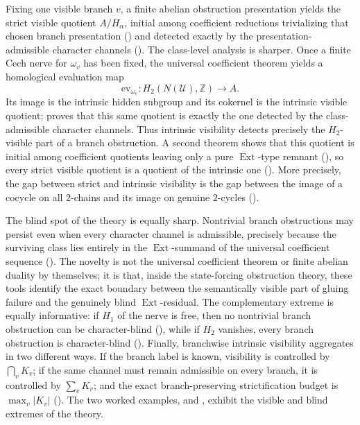 Fixing one visible branch $v$, a finite abelian obstruction presentation yields the strict visible quotient $A/H_\alpha$, initial among coefficient reductions trivializing that chosen branch presentation () and detected exactly by the presentation-admissible character channels (). The class-level analysis is sharper. Once a finite Cech nerve for $\omega_v$ has been fixed, the universal coefficient theorem yields a homological evaluation map
\[
\mathrm{ev}_{\omega_v}:H_2(N(\mathcal U),\mathbb Z)\to A.
\]
Its image is the intrinsic hidden subgroup and its cokernel is the intrinsic visible quotient;  proves that this same quotient is exactly the one detected by the class-admissible character channels. Thus intrinsic visibility detects precisely the $H_2$-visible part of a branch obstruction. A second theorem shows that this quotient is initial among coefficient quotients leaving only a pure $\operatorname{Ext}$-type remnant (), so every strict visible quotient is a quotient of the intrinsic one (). More precisely, the gap between strict and intrinsic visibility is the gap between the image of a cocycle on all $2$-chains and its image on genuine $2$-cycles ().

The blind spot of the theory is equally sharp. Nontrivial branch obstructions may persist even when every character channel is admissible, precisely because the surviving class lies entirely in the $\operatorname{Ext}$-summand of the universal coefficient sequence (). The novelty is not the universal coefficient theorem or finite abelian duality by themselves; it is that, inside the state-forcing obstruction theory, these tools identify the exact boundary between the semantically visible part of gluing failure and the genuinely blind $\operatorname{Ext}$-residual. The complementary extreme is equally informative: if $H_1$ of the nerve is free, then no nontrivial branch obstruction can be character-blind (), while if $H_2$ vanishes, every branch obstruction is character-blind (). Finally, branchwise intrinsic visibility aggregates in two different ways. If the branch label is known, visibility is controlled by $\bigcap_v K_v$; if the same channel must remain admissible on every branch, it is controlled by $\sum_v K_v$; and the exact branch-preserving strictification budget is $\max_v |K_v|$ (). The two worked examples,  and , exhibit the visible and blind extremes of the theory.

